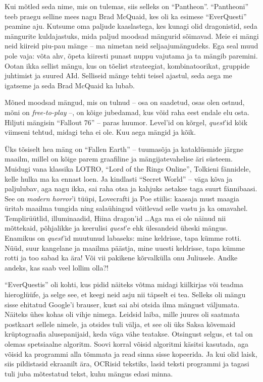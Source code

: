 Kui mõtled seda nime, mis on tulemas, siis selleks on 
\enquote{Pantheon}. \enquote{Pantheoni} teeb praegu selline mees nagu Brad McQuaid, kes oli ka 
esimese \enquote{EverQuesti} peamine aju. Kutsume oma paljude 
kaaslastega, kes kunagi olid dragonistid, seda mängurite kuldajastuks, 
mida paljud moodsad mängurid sõimavad. Meie ei mängi neid kiireid 
piu-pau mänge -- ma nimetan neid seljaajumängudeks. Ega seal muud pole vaja: 
võta ahv, õpeta kiiresti punast nuppu vajutama ja ta mängib paremini. Ootan ikka 
sellist mängu, kus on tõelist strateegiat, kombinatoorikat, gruppide juhtimist ja 
suured AId. Selliseid mänge tehti teisel ajastul, seda aega me igatseme 
ja seda Brad McQuaid ka lubab.

Mõned moodsad mängud, mis on tulnud -- osa on saadetud, osas olen ostnud, 
mõni on \emph{free-to-play} --, on kõige jubedamad, kus võid raha eest 
endale elu osta. Hiljuti mängisin \enquote{Fallout 76} -- paras huumor. 
Level'id on kõrgel, \emph{quest}'id kõik viimseni tehtud, midagi teha ei 
ole. Kuu aega mängid ja kõik. 

Üks tõsiselt hea mäng on \enquote{Fallen Earth} -- 
tuumasõja ja kataklüsmide järgne maailm, millel on
kõige parem graafiline ja mängijatevahelise äri süsteem. Muidugi 
vana klassika LOTRO, \enquote{Lord of the Rings Online}, Tolkieni fännidele, kelle hulka 
ma ka ennast loen. Ja kindlasti \enquote{Secret World} -- väga kõva ja paljulubav, 
aga nagu ikka, sai raha otsa ja kahjuks aetakse taga suurt fännibaasi. See on \emph{modern horror}'i tüüpi, Lovecrafti 
ja Poe stiilis: kaasaja must maagia üritab maailma 
tungida ning salaühingud võitlevad selle vastu ja ka omavahel. Templirüütlid, 
illuminaadid, Hiina dragon'id \ldots Aga ma ei ole näinud nii mõttekaid, 
põhjalikke ja keerulisi \emph{quest}'e ehk ülesandeid üheski mängus. Enamikus on 
\emph{quest}'id muutunud labaseks: mine 
keldrisse, tapa kümme rotti. Nüüd, suur kangelane ja maailma päästja, mine uuesti 
keldrisse, tapa kümme rotti ja too sabad ka ära! Või vii pakikene kõrvalkülla onu 
Juliusele. Andke andeks, kas saab veel lollim olla?!

\enquote{EverQuestis} oli kohti, kus pidid näiteks võtma midagi kiilkirjas või 
teadma hieroglüüfe, ja selge see, et keegi neid asju nii täpselt ei tea. 
Selleks oli mängu sisse ehitatud Google'i brauser, kust sai abi otsida ilma mängust väljumata. Näiteks ühes kohas oli vihje 
nimega. Leidsid laiba, mille juures oli saatmata postkaart sellele nimele, ja 
otsides tuli välja, et see oli üks Saksa kõvemaid krüptograafia 
alusepanijaid, keda väga vähe teatakse. Otsingust selgus, et tal on olemas 
spetsiaalne algoritm. Soovi korral võisid algoritmi käsitsi kasutada, aga 
võisid ka programmi alla tõmmata ja read sinna sisse kopeerida. Ja kui olid laisk, siis pildistasid ekraanilt ära, OCRisid tekstiks, lasid teksti 
programmi ja tagasi tuli juba mõtestatud tekst, kuhu mängus edasi minna.